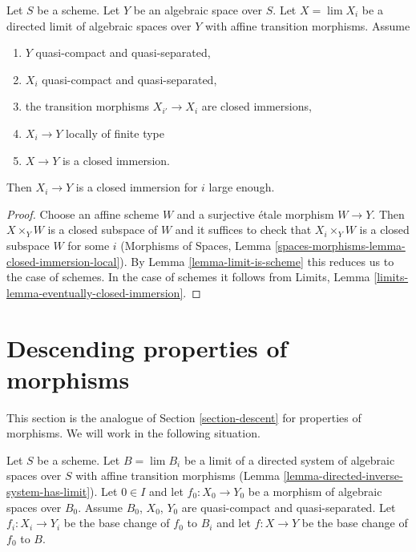 \begin{lemma}
\label{lemma-eventually-closed-immersion}
Let $S$ be a scheme. Let $Y$ be an algebraic space over $S$.
Let $X = \lim X_i$ be a directed limit of algebraic spaces
over $Y$ with affine transition morphisms. Assume
\begin{enumerate}
\item $Y$ quasi-compact and quasi-separated,
\item $X_i$ quasi-compact and quasi-separated,
\item the transition morphisms $X_{i'} \to X_i$ are closed immersions,
\item $X_i \to Y$ locally of finite type
\item $X \to Y$ is a closed immersion.
\end{enumerate}
Then $X_i \to Y$ is a closed immersion for $i$ large enough.
\end{lemma}

\begin{proof}
Choose an affine scheme $W$ and a surjective \'etale morphism $W \to Y$.
Then $X \times_Y W$ is a closed subspace of $W$ and it suffices to check
that $X_i \times_Y W$ is a closed subspace $W$ for some $i$
(Morphisms of Spaces,
Lemma \ref{spaces-morphisms-lemma-closed-immersion-local}). By
Lemma \ref{lemma-limit-is-scheme} this reduces us to the case of schemes.
In the case of schemes it follows from
Limits, Lemma \ref{limits-lemma-eventually-closed-immersion}.
\end{proof}

















\section{Descending properties of morphisms}
\label{section-descent-of-properties}

\noindent
This section is the analogue of Section \ref{section-descent}
for properties of morphisms. We will work in the following situation.

\begin{situation}
\label{situation-descent-property}
Let $S$ be a scheme. Let $B = \lim B_i$ be a limit of a directed system
of algebraic spaces over $S$ with affine transition morphisms
(Lemma \ref{lemma-directed-inverse-system-has-limit}).
Let $0 \in I$ and let $f_0 : X_0 \to Y_0$ be a morphism of algebraic spaces
over $B_0$. Assume $B_0$, $X_0$, $Y_0$ are quasi-compact and quasi-separated.
Let $f_i : X_i \to Y_i$ be the base change of $f_0$ to $B_i$ and
let $f : X \to Y$ be the base change of $f_0$ to $B$.
\end{situation}

